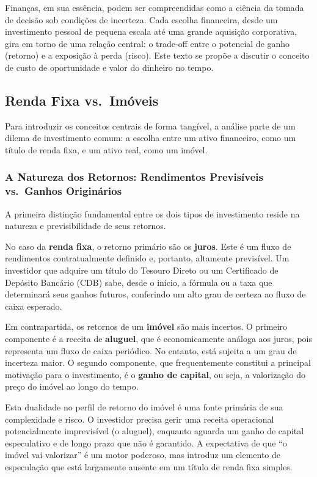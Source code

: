 \documentclass[
  a4paper,
]{book}
\begin{document}
Finanças, em sua essência, podem ser compreendidas como a ciência da
tomada de decisão sob condições de incerteza. Cada escolha financeira,
desde um investimento pessoal de pequena escala até uma grande aquisição
corporativa, gira em torno de uma relação central: o trade-off entre o
potencial de ganho (retorno) e a exposição à perda (risco). Este texto
se propõe a discutir o conceito de custo de oportunidade e valor do
dinheiro no tempo.

\subsection{Renda Fixa vs.~Imóveis}\label{renda-fixa-vs.-imuxf3veis}

Para introduzir os conceitos centrais de forma tangível, a análise parte
de um dilema de investimento comum: a escolha entre um ativo financeiro,
como um título de renda fixa, e um ativo real, como um imóvel.

\subsubsection{A Natureza dos Retornos: Rendimentos Previsíveis
vs.~Ganhos
Originários}\label{a-natureza-dos-retornos-rendimentos-previsuxedveis-vs.-ganhos-originuxe1rios}

A primeira distinção fundamental entre os dois tipos de investimento
reside na natureza e previsibilidade de seus retornos.

No caso da \textbf{renda fixa}, o retorno primário são os
\textbf{juros}. Este é um fluxo de rendimentos contratualmente definido
e, portanto, altamente previsível. Um investidor que adquire um título
do Tesouro Direto ou um Certificado de Depósito Bancário (CDB) sabe,
desde o início, a fórmula ou a taxa que determinará seus ganhos futuros,
conferindo um alto grau de certeza ao fluxo de caixa esperado.

Em contrapartida, os retornos de um \textbf{imóvel} são mais incertos. O
primeiro componente é a receita de \textbf{aluguel}, que é
economicamente análoga aos juros, pois representa um fluxo de caixa
periódico. No entanto, está sujeita a um grau de incerteza maior. O
segundo componente, que frequentemente constitui a principal motivação
para o investimento, é o \textbf{ganho de capital}, ou seja, a
valorização do preço do imóvel ao longo do tempo.

Esta dualidade no perfil de retorno do imóvel é uma fonte primária de
sua complexidade e risco. O investidor precisa gerir uma receita
operacional potencialmente imprevisível (o aluguel), enquanto aguarda um
ganho de capital especulativo e de longo prazo que não é garantido. A
expectativa de que ``o imóvel vai valorizar'' é um motor poderoso, mas
introduz um elemento de especulação que está largamente ausente em um
título de renda fixa simples.
\end{document}
